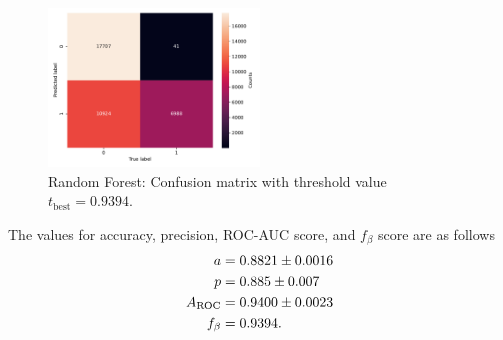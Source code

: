 \begin{figure}
    \centering
    \includegraphics[width=0.5\textwidth]{content/plots/confusion_kNN.pdf}
    \caption{Random Forest: Confusion matrix with threshold value $t_{\mathrm{best}} = \num{0.9394}$.}
    \label{fig:confusion_kNN}
\end{figure}
The values for accuracy, precision, ROC-AUC score, and $f_{\beta}$ score are as follows
\begin{align*}
    a &= \num{0.8821+-0.0016} \\
    p &= \num{0.885+-0.007}  \\
    A_{\mathrm{ROC}} &= \num{0.9400+-0.0023} \\
    f_{\beta} &= \num{0.9394}.
\end{align*}

